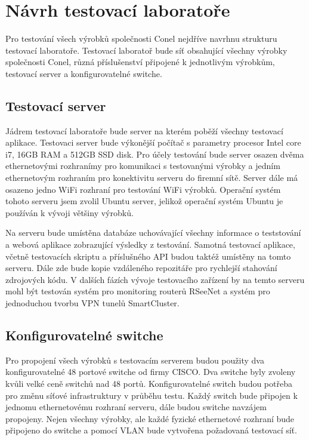 \chapter{Návrh testovací laboratoře}

Pro testování všech výrobků společnosti Conel nejdříve navrhnu strukturu testovací laboratoře.  Testovací laboratoř bude síť obsahující všechny výrobky společnosti Conel, různá příslušenství připojené k jednotlivým výrobkům, testovací server a konfigurovatelné switche.

\section{Testovací server}
Jádrem testovací laboratoře bude server na kterém poběží všechny testovací aplikace. Testovaci server bude výkonější počítač s parametry procesor Intel core i7, 16GB RAM a 512GB SSD disk. Pro účely testování bude server osazen dvěma ethernetovými rozhranímy pro komunikaci s testovanými výrobky a jedním ethernetovým rozhraním pro konektivitu serveru do firemní sítě. Server dále má osazeno jedno WiFi rozhraní pro testování WiFi výrobků.  Operační systém tohoto serveru jsem zvolil Ubuntu server, jelikož operační systém Ubuntu je používán k vývoji většiny výrobků.

Na serveru bude umístěna databáze uchovávající všechny informace o teststování a webová aplikace zobrazující výsledky z testování. Samotná testovací aplikace, včetně testovacích skriptu a příslušného API budou taktéž umístěny na tomto serveru. Dále zde bude kopie vzdáleného repozitáře pro rychlejší stahování zdrojových kódu. V dalších fázích vývoje testovacího zařízení by na temto serveru mohl být testován systém pro monitoring routerů RSeeNet a systém pro jednoduchou tvorbu VPN tunelů SmartCluster.

\section{Konfigurovatelné switche}
Pro propojení všech výrobků s testovacím serverem budou použity dva konfigurovatelné 48 portové switche od firmy CISCO. Dva switche byly zvoleny kvůli velké ceně switchů nad 48 portů. Konfigurovatelné switch budou potřeba pro změnu síťové infrastruktury v průběhu testu. Každý switch bude připojen k jednomu ethernetovému rozhraní serveru, dále budou switche navzájem propojeny. Nejen všechny výrobky, ale každé fyzické ethernetové rozhraní bude připojeno do switche a pomocí VLAN bude vytvořena požadovaná testovací síť.

